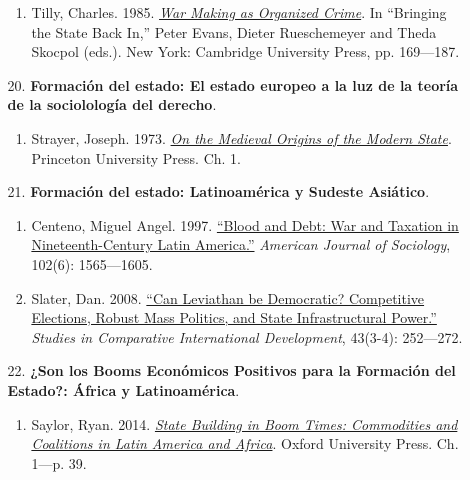\documentclass[letterpaper]{article}
\begin{document}
\begin{enumerate}
\begin{enumerate}
\begin{enumerate}
					\item Tilly, Charles. 1985. \href{https://github.com/hbahamonde/Ciencia_Politica_I/raw/master/Readings/Tilly.pdf}{\emph{War Making as Organized Crime}}. In ``Bringing the State Back In,'' Peter Evans, Dieter Rueschemeyer and Theda Skocpol (eds.). New York: Cambridge University Press, pp. 169---187.
				\end{enumerate}
			
			\item[20.] {\bf Formaci\'on del estado: El estado europeo a la luz de la teor\'ia de la sociololog\'ia del derecho}.
				\begin{enumerate} 
					\item Strayer, Joseph. 1973. \href{https://github.com/hbahamonde/Ciencia_Politica_I/raw/master/Readings/Strayer.pdf}{\emph{On the Medieval Origins of the Modern State}}. Princeton University Press. Ch. 1.
				\end{enumerate}

			\item[21.] {\bf Formaci\'on del estado: Latinoam\'erica y Sudeste Asi\'atico}.
				\begin{enumerate}
					\item Centeno, Miguel Angel. 1997. \href{https://github.com/hbahamonde/Ciencia_Politica_I/raw/master/Readings/Centeno.pdf}{``Blood and Debt: War and Taxation in Nineteenth-Century Latin America.''} \emph{American Journal of Sociology}, 102(6): 1565---1605. 
					
					\item Slater, Dan. 2008. \href{https://github.com/hbahamonde/Ciencia_Politica_I/raw/master/Readings/Slater.pdf}{``Can Leviathan be Democratic? Competitive Elections, Robust Mass Politics, and State Infrastructural Power.''} \emph{Studies in Comparative International Development}, 43(3-4): 252---272.
				\end{enumerate}

			\item[22.] {\bf ¿Son los Booms Econ\'omicos Positivos para la Formaci\'on del Estado?: \'Africa y Latinoam\'erica}.
				\begin{enumerate}
					\item Saylor, Ryan. 2014. \href{https://github.com/hbahamonde/Ciencia_Politica_I/raw/master/Readings/Saylor.pdf}{\emph{State Building in Boom Times: Commodities and Coalitions in Latin America and Africa}}. Oxford University Press. Ch. 1---p. 39.
					

\end{enumerate}
\end{enumerate}
\end{enumerate}
\end{document}
